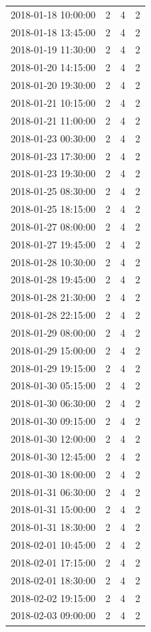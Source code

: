 \begin{tabular}{lrrr}
2018-01-18 10:00:00 & 2 & 4 & 2 \\
2018-01-18 13:45:00 & 2 & 4 & 2 \\
2018-01-19 11:30:00 & 2 & 4 & 2 \\
2018-01-20 14:15:00 & 2 & 4 & 2 \\
2018-01-20 19:30:00 & 2 & 4 & 2 \\
2018-01-21 10:15:00 & 2 & 4 & 2 \\
2018-01-21 11:00:00 & 2 & 4 & 2 \\
2018-01-23 00:30:00 & 2 & 4 & 2 \\
2018-01-23 17:30:00 & 2 & 4 & 2 \\
2018-01-23 19:30:00 & 2 & 4 & 2 \\
2018-01-25 08:30:00 & 2 & 4 & 2 \\
2018-01-25 18:15:00 & 2 & 4 & 2 \\
2018-01-27 08:00:00 & 2 & 4 & 2 \\
2018-01-27 19:45:00 & 2 & 4 & 2 \\
2018-01-28 10:30:00 & 2 & 4 & 2 \\
2018-01-28 19:45:00 & 2 & 4 & 2 \\
2018-01-28 21:30:00 & 2 & 4 & 2 \\
2018-01-28 22:15:00 & 2 & 4 & 2 \\
2018-01-29 08:00:00 & 2 & 4 & 2 \\
2018-01-29 15:00:00 & 2 & 4 & 2 \\
2018-01-29 19:15:00 & 2 & 4 & 2 \\
2018-01-30 05:15:00 & 2 & 4 & 2 \\
2018-01-30 06:30:00 & 2 & 4 & 2 \\
2018-01-30 09:15:00 & 2 & 4 & 2 \\
2018-01-30 12:00:00 & 2 & 4 & 2 \\
2018-01-30 12:45:00 & 2 & 4 & 2 \\
2018-01-30 18:00:00 & 2 & 4 & 2 \\
2018-01-31 06:30:00 & 2 & 4 & 2 \\
2018-01-31 15:00:00 & 2 & 4 & 2 \\
2018-01-31 18:30:00 & 2 & 4 & 2 \\
2018-02-01 10:45:00 & 2 & 4 & 2 \\
2018-02-01 17:15:00 & 2 & 4 & 2 \\
2018-02-01 18:30:00 & 2 & 4 & 2 \\
2018-02-02 19:15:00 & 2 & 4 & 2 \\
2018-02-03 09:00:00 & 2 & 4 & 2 \\

\end{tabular}
